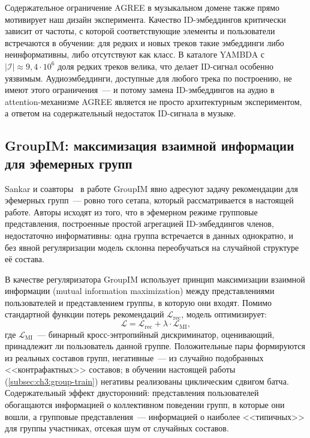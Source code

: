 Содержательное ограничение AGREE в музыкальном домене также прямо мотивирует наш дизайн эксперимента. Качество ID-эмбеддингов критически зависит от частоты, с которой соответствующие элементы и пользователи встречаются в обучении: для редких и новых треков такие эмбеддинги либо неинформативны, либо отсутствуют как класс. В каталоге YAMBDA с $|\mathcal{I}| \approx 9{,}4 \cdot 10^6$ доля редких треков велика, что делает ID-сигнал особенно уязвимым. Аудиоэмбеддинги, доступные для любого трека по построению, не имеют этого ограничения~--- и потому замена ID-эмбеддингов на аудио в attention-механизме AGREE является не просто архитектурным экспериментом, а ответом на содержательный недостаток ID-сигнала в музыке.

\subsection{GroupIM: максимизация взаимной информации для эфемерных групп}
\label{subsec:ch2:groupim}

Sankar и соавторы~\cite{sankar2020groupim} в работе GroupIM явно адресуют задачу рекомендации для эфемерных групп~--- ровно того сетапа, который рассматривается в настоящей работе. Авторы исходят из того, что в эфемерном режиме групповые представления, построенные простой агрегацией ID-эмбеддингов членов, недостаточно информативны: одна группа встречается в данных однократно, и без явной регуляризации модель склонна переобучаться на случайной структуре её состава.

В качестве регуляризатора GroupIM использует принцип максимизации взаимной информации (mutual information maximization) между представлениями пользователей и представлением группы, в которую они входят. Помимо стандартной функции потерь рекомендаций $\mathcal{L}_{\mathrm{rec}}$, модель оптимизирует:
\begin{equation}
    \mathcal{L} = \mathcal{L}_{\mathrm{rec}} + \lambda \cdot \mathcal{L}_{\mathrm{MI}},
    \label{eq:ch2:groupim-loss}
\end{equation}
где $\mathcal{L}_{\mathrm{MI}}$~--- бинарный кросс-энтропийный дискриминатор, оценивающий, принадлежит ли пользователь данной группе. Положительные пары формируются из реальных составов групп, негативные~--- из случайно подобранных <<контрафактных>> составов; в обучении настоящей работы (\ref{subsec:ch3:group-train}) негативы реализованы циклическим сдвигом батча. Содержательный эффект двусторонний: представления пользователей обогащаются информацией о коллективном поведении групп, в которые они вошли, а групповые представления~--- информацией о наиболее <<типичных>> для группы участниках, отсекая шум от случайных составов.

